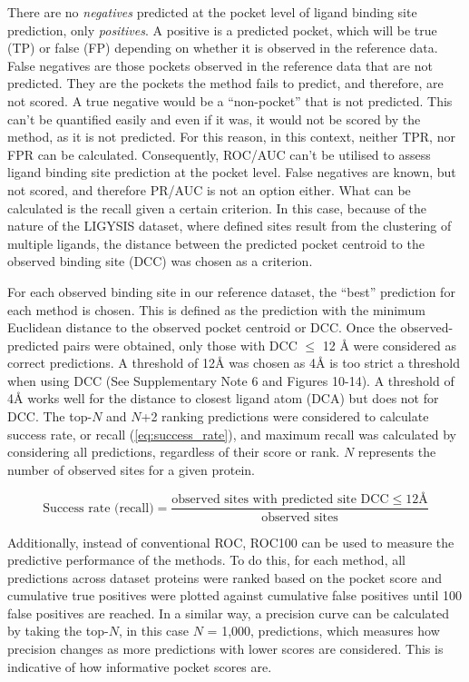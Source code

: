 There are no \textit{negatives} predicted at the pocket level of ligand binding site prediction, only \textit{positives}. A positive is a predicted pocket, which will be true (TP) or false (FP) depending on whether it is observed in the reference data. False negatives are those pockets observed in the reference data that are not predicted. They are the pockets the method fails to predict, and therefore, are not scored. A true negative would be a ``non-pocket'' that is not predicted. This can't be quantified easily and even if it was, it would not be scored by the method, as it is not predicted. For this reason, in this context, neither TPR, nor FPR can be calculated. Consequently, ROC/AUC can't be utilised to assess ligand binding site prediction at the pocket level. False negatives are known, but not scored, and therefore PR/AUC is not an option either. What can be calculated is the recall given a certain criterion. In this case, because of the nature of the LIGYSIS dataset, where defined sites result from the clustering of multiple ligands, the distance between the predicted pocket centroid to the observed binding site (DCC) was chosen as a criterion.

For each observed binding site in our reference dataset, the ``best'' prediction for each method is chosen. This is defined as the prediction with the minimum Euclidean distance to the observed pocket centroid or DCC. Once the observed-predicted pairs were obtained, only those with DCC $\leq$ 12 \AA{} were considered as correct predictions. A threshold of 12\AA{} was chosen as 4\AA{} is too strict a threshold when using DCC (See Supplementary Note 6 and Figures 10-14). A threshold of 4\AA{} works well for the distance to closest ligand atom (DCA) but does not for DCC. The top-$N$ and $N$+2 ranking predictions were considered to calculate success rate, or recall (\autoref{eq:success_rate}), and maximum recall was calculated by considering all predictions, regardless of their score or rank. $N$ represents the number of observed sites for a given protein.

\begin{equation}
\text{Success rate (recall)} = \frac{\text{observed sites with predicted site DCC} \leq 12 \text{Å}}{\text{observed sites}}
\label{eq:success_rate}
\end{equation}

Additionally, instead of conventional ROC, ROC100 \cite{WEBBER_2003_ROC100, SCOTT_2007_ROC100} can be used to measure the predictive performance of the methods. To do this, for each method, all predictions across dataset proteins were ranked based on the pocket score and cumulative true positives were plotted against cumulative false positives until 100 false positives are reached. In a similar way, a precision curve can be calculated by taking the top-$N$, in this case $N$ = 1,000, predictions, which measures how precision changes as more predictions with lower scores are considered. This is indicative of how informative pocket scores are.

